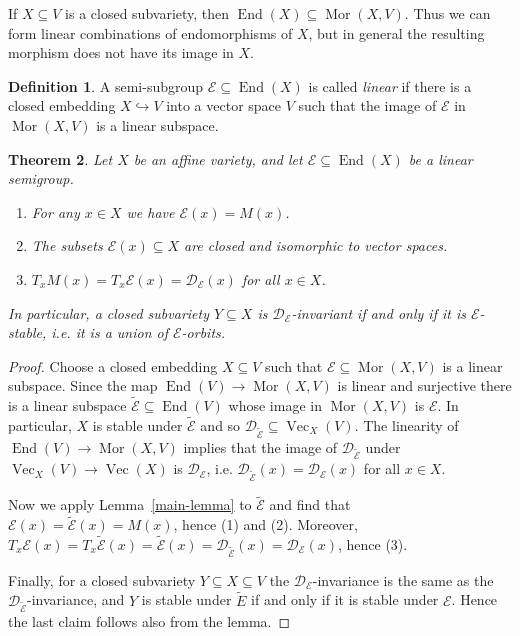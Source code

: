 \documentclass{amsart}
\newtheorem{thm}{Theorem}[section]
\theoremstyle{definition}
\newtheorem{defn}[thm]{Definition}
\theoremstyle{remark}
\begin{document}
If $X {\subseteq} V$ is a closed subvariety, then $\operatorname{End}(X) {\subseteq} \operatorname{Mor}(X,V)$. Thus we can form linear combinations of endomorphisms of $X$, but in general the resulting morphism does not have its image in $X$.

\begin{defn} A semi-subgroup ${\mathcal E} {\subseteq} \operatorname{End}(X)$ is called {\it linear} if there is a closed embedding $X {\hookrightarrow} V$ into a vector space $V$ such that the image of ${\mathcal E}$ in $\operatorname{Mor}(X,V)$ is a linear subspace.
\end{defn}

\begin{thm}\label{main-theorem-1}
Let $X$ be an affine variety, and let ${\mathcal E} {\subseteq} \operatorname{End}(X)$ be a linear semigroup. 
\begin{enumerate}
\item
For any $x \in X$ we have ${\mathcal E}(x) = M(x)$. 
\item
The subsets ${\mathcal E}(x){\subseteq} X$ are closed and isomorphic to vector spaces.
\item
$T_{x}M(x) = T_{x}{\mathcal E}(x) = {\mathcal D}_{\mathcal E}(x)$ for all $x \in X$.
\end{enumerate}
In particular, a closed subvariety $Y {\subseteq} X$ is ${\mathcal D}_{\mathcal E}$-invariant if and only if it is ${\mathcal E}$-stable, i.e. it is a union of ${\mathcal E}$-orbits.
\end{thm}
\begin{proof}
Choose a closed embedding $X {\subseteq} V$  such that ${\mathcal E} {\subseteq} \operatorname{Mor}(X,V)$ is a linear subspace. Since the map $\operatorname{End}(V) \to \operatorname{Mor}(X,V)$ is linear and surjective  there is a linear subspace $\tilde{\mathcal E} {\subseteq}\operatorname{End}(V)$ whose image in $\operatorname{Mor}(X,V)$ is ${\mathcal E}$. In particular, $X$ is stable under $\tilde{\mathcal E}$ and so  ${\mathcal D}_{\tilde{\mathcal E}} {\subseteq} \operatorname{Vec}_{X}(V)$. The linearity of  $\operatorname{End}(V) \to \operatorname{Mor}(X,V)$ implies that the image of  ${\mathcal D}_{\tilde{\mathcal E}}$ under $\operatorname{Vec}_{X}(V) \to \operatorname{Vec}(X)$ is ${\mathcal D}_{\mathcal E}$, i.e. ${\mathcal D}_{\tilde{\mathcal E}}(x) = {\mathcal D}_{\mathcal E}(x)$ for all $x \in X$.

Now we apply  Lemma~\ref{main-lemma} to $\tilde {\mathcal E}$ and find that ${\mathcal E}(x) = \tilde{\mathcal E}(x) = M(x)$, hence (1) and (2). Moreover, $T_{x}{\mathcal E}(x) = T_{x}\tilde{\mathcal E}(x) = \tilde{\mathcal E}(x) = {\mathcal D}_{\tilde{\mathcal E}}(x) = {\mathcal D}_{\mathcal E}(x)$, hence (3). 

Finally, for a closed subvariety $Y {\subseteq} X {\subseteq} V$ the ${\mathcal D}_{\mathcal E}$-invariance is the same as the ${\mathcal D}_{\tilde{\mathcal E}}$-invariance, and $Y$ is stable under $\tilde E$ if and only if it is stable under ${\mathcal E}$. Hence the last claim follows also from the lemma.
\end{proof}
\end{document}
